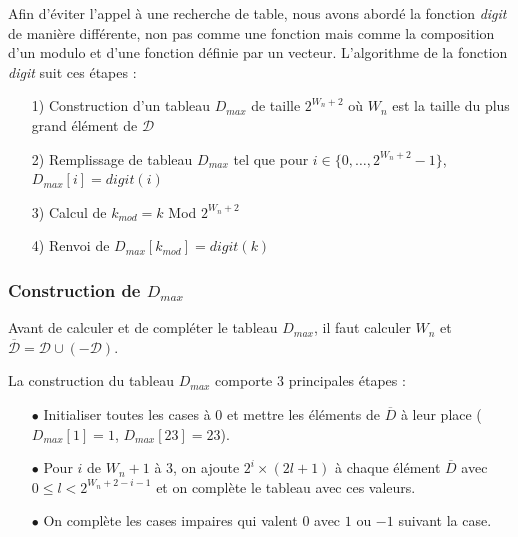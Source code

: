 \documentclass[12pt, a4paper]{memoir}
\begin{document}
Afin d'éviter l'appel à une recherche de table, nous avons abordé la fonction \emph{digit} de manière différente,
non pas comme une fonction mais comme la composition d'un modulo et d'une fonction définie par un vecteur.
L'algorithme de la fonction \emph{digit} suit ces étapes :
\begin{itemize}
 \item [1)] Construction d'un tableau \emph{$D_{max}$} de taille $2^{W_n+2}$ où $W_n$ est la taille du plus grand élément de $\mathcal{D}$
 \item [2)] Remplissage de tableau \emph{$D_{max}$} tel que pour $i \in \{0,\ldots,2^{W_n+2}-1\}$, $D_{max}[i] = digit(i)$
 \item [3)] Calcul de $k_{mod} = k$ Mod $2^{W_n+2}$
 \item [4)] Renvoi de $D_{max}[k_{mod}] = digit(k)$
\end{itemize}

\subsubsection{Construction de \emph{$D_{max}$}}

Avant de calculer et de compléter le tableau \emph{$D_{max}$}, il faut calculer $W_n$ et $\overline{\mathcal{D}} = \mathcal{D} \cup (-\mathcal{D})$.

La construction du tableau \emph{$D_{max}$} comporte $3$ principales étapes :
\begin{itemize}
 \item[$\bullet$] Initialiser toutes les cases à $0$ et mettre les éléments de $\overline{D}$ à leur place ($D_{max}[1] = 1$, $D_{max}[23] = 23$).
 \item[$\bullet$] Pour $i$ de $W_n+1$ à $3$, on ajoute $2^i \times (2l+1)$ à chaque élément $\overline{D}$ avec $0 \leq l < 2^{W_n+2-i-1}$ et on complète le tableau avec ces valeurs. 
 \item[$\bullet$] On complète les cases impaires qui valent $0$ avec $1$ ou $-1$ suivant la case.
\end{itemize}
\end{document}
